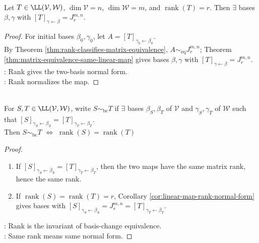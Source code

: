 \begin{corollary} \label{cor:linear-map-rank-normal-form} \\
Let $T\in\LL(\mathcal{V},\mathcal{W})$, $\dim\mathcal{V}=n$, $\dim\mathcal{W}=m$, and $\operatorname{rank}(T)=r$. Then $\exists$ bases $\beta,\gamma$ with $[T]_{\gamma\leftarrow\beta}=J_r^{m,n}$.
\begin{proof}
For initial bases $\beta_0,\gamma_0$, let $A=[T]_{\gamma_0\leftarrow\beta_0}$.\\
By Theorem \ref{thm:rank-classifies-matrix-equivalence}, $A\sim_{\mathrm{eq}}J_r^{m,n}$; Theorem \ref{thm:matrix-equivalence-same-linear-map} gives bases $\beta,\gamma$ with $[T]_{\gamma\leftarrow\beta}=J_r^{m,n}$.\\
: Rank gives the two-basis normal form.\\
: Rank normalizes the map.
\end{proof}
\end{corollary}

\begin{corollary} \label{cor:linear-map-equivalence-by-rank} \\
For $S,T\in\LL(\mathcal{V},\mathcal{W})$, write $S\sim_{\mathrm{bc}}T$ if $\exists$ bases $\beta_S,\beta_T$ of $\mathcal{V}$ and $\gamma_S,\gamma_T$ of $\mathcal{W}$ such that $[S]_{\gamma_S\leftarrow\beta_S}=[T]_{\gamma_T\leftarrow\beta_T}$.\\
Then $S\sim_{\mathrm{bc}}T$ $\Longleftrightarrow$ $\operatorname{rank}(S)=\operatorname{rank}(T)$
\begin{proof}
\begin{enumerate}[label=\roman*.]
\setlength{\itemsep}{0pt}
\item[$(\Rightarrow)$] If $[S]_{\gamma_S\leftarrow\beta_S}=[T]_{\gamma_T\leftarrow\beta_T}$, then the two maps have the same matrix rank, hence the same rank.
\item[$(\Leftarrow)$] If $\operatorname{rank}(S)=\operatorname{rank}(T)=r$, Corollary \ref{cor:linear-map-rank-normal-form} gives bases with $[S]_{\gamma_S\leftarrow\beta_S}=J_r^{m,n}=[T]_{\gamma_T\leftarrow\beta_T}$.
\end{enumerate}
: Rank is the invariant of basis-change equivalence.\\
: Same rank means same normal form.
\end{proof}
\end{corollary}

